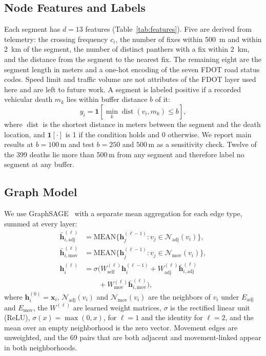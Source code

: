 \documentclass[letterpaper]{article}
\begin{document}
\subsection{Node Features and Labels}
Each segment has $d = 13$ features (Table~\ref{tab:features}). Five are
derived from telemetry: the crossing frequency $c_i$, the number of fixes
within 500~m and within 2~km of the segment, the number of distinct panthers
with a fix within 2~km, and the distance from the segment to the nearest fix.
The remaining eight are the segment length in meters and a one-hot encoding of
the seven FDOT road status codes. Speed limit and traffic volume are not attributes of the FDOT layer used here and are left to future
work. A segment is labeled positive if a recorded vehicular death $m_k$ lies within
buffer distance $b$ of it:
\begin{equation}
  y_i = \mathbf{1}\!\left[\min_k \operatorname{dist}(v_i, m_k) \le b\right],
  \label{eq:label}
\end{equation}
where $\operatorname{dist}$ is the shortest distance in meters between the
segment and the death location, and $\mathbf{1}[\cdot]$ is 1 if the condition
holds and 0 otherwise. We report main results at $b = 100$\,m and test
$b = 250$ and $500$\,m as a sensitivity check. Twelve of the 399 deaths lie
more than 500\,m from any segment and therefore label no segment at any
buffer.
\subsection{Graph Model}
We use GraphSAGE~\cite{hamilton2017inductive} with a separate mean
aggregation for each edge type, summed at every layer:
\begin{align}
  \bar{\mathbf{h}}_{i,\mathrm{adj}}^{(\ell)} &= \mathrm{MEAN}\{\mathbf{h}_j^{(\ell-1)} : v_j \in \mathcal{N}_{\mathrm{adj}}(v_i)\}, \nonumber \\
  \bar{\mathbf{h}}_{i,\mathrm{mov}}^{(\ell)} &= \mathrm{MEAN}\{\mathbf{h}_j^{(\ell-1)} : v_j \in \mathcal{N}_{\mathrm{mov}}(v_i)\}, \nonumber \\
  \mathbf{h}_i^{(\ell)} &= \sigma\big(W_{\mathrm{self}}^{(\ell)} \mathbf{h}_i^{(\ell-1)}
    + W_{\mathrm{adj}}^{(\ell)} \bar{\mathbf{h}}_{i,\mathrm{adj}}^{(\ell)} \nonumber \\
  &\qquad + W_{\mathrm{mov}}^{(\ell)} \bar{\mathbf{h}}_{i,\mathrm{mov}}^{(\ell)}\big),
  \label{eq:sage}
\end{align}
where $\mathbf{h}_i^{(0)} = \mathbf{x}_i$, $\mathcal{N}_{\mathrm{adj}}(v_i)$
and $\mathcal{N}_{\mathrm{mov}}(v_i)$ are the neighbors of $v_i$ under
$E_{\mathrm{adj}}$ and $E_{\mathrm{mov}}$, the $W^{(\ell)}$ are learned weight
matrices, $\sigma$ is the rectified linear unit (ReLU), $\sigma(x)=\max(0,x)$, for $\ell = 1$ and the identity for $\ell = 2$, and the mean over an empty
neighborhood is the zero vector. Movement edges are unweighted, and the 69
pairs that are both adjacent and movement-linked appear in both
neighborhoods.
\end{document}

